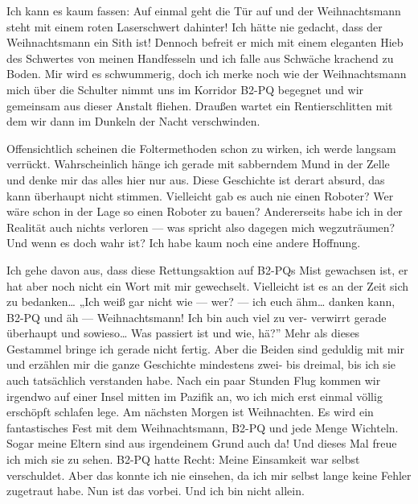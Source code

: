 Ich kann es kaum fassen: Auf einmal geht die Tür auf und der Weihnachtsmann steht mit einem roten Laserschwert dahinter! Ich hätte nie gedacht, dass der Weihnachtsmann ein Sith ist! Dennoch befreit er mich mit einem eleganten Hieb des Schwertes von meinen Handfesseln und ich falle aus Schwäche krachend zu Boden. Mir wird es schwummerig, doch ich merke noch wie der Weihnachtsmann mich über die Schulter nimmt uns im Korridor B2-PQ begegnet und wir gemeinsam aus dieser Anstalt fliehen. Draußen wartet ein Rentierschlitten mit dem wir dann im Dunkeln der Nacht verschwinden.

Offensichtlich scheinen die Foltermethoden schon zu wirken, ich werde langsam verrückt. Wahrscheinlich hänge ich gerade mit sabberndem Mund in der Zelle und denke mir das alles hier nur aus. Diese Geschichte ist derart absurd, das kann überhaupt nicht stimmen. Vielleicht gab es auch nie einen Roboter? Wer wäre schon in der Lage so einen Roboter zu bauen? Andererseits habe ich in der Realität auch nichts verloren — was spricht also dagegen mich wegzuträumen? Und wenn es doch wahr ist? Ich habe kaum noch eine andere Hoffnung.

Ich gehe davon aus, dass diese Rettungsaktion auf B2-PQs Mist gewachsen ist, er hat aber noch nicht ein Wort mit mir gewechselt. Vielleicht ist es an der Zeit sich zu bedanken… „Ich weiß gar nicht wie — wer? — ich euch ähm… danken kann, B2-PQ und äh — Weihnachtsmann! Ich bin auch viel zu ver- verwirrt gerade überhaupt und sowieso… Was passiert ist und wie, hä?” Mehr als dieses Gestammel bringe ich gerade nicht fertig. Aber die Beiden sind geduldig mit mir und erzählen mir die ganze Geschichte mindestens zwei- bis dreimal, bis ich sie auch tatsächlich verstanden habe. Nach ein paar Stunden Flug kommen wir irgendwo auf einer Insel mitten im Pazifik an, wo ich mich erst einmal völlig erschöpft schlafen lege.
Am nächsten Morgen ist Weihnachten. Es wird ein fantastisches Fest mit dem Weihnachtsmann, B2-PQ und jede Menge Wichteln. Sogar meine Eltern sind aus irgendeinem Grund auch da! Und dieses Mal freue ich mich sie zu sehen. B2-PQ hatte Recht: Meine Einsamkeit war selbst verschuldet. Aber das konnte ich nie einsehen, da ich mir selbst lange keine Fehler zugetraut habe. Nun ist das vorbei. Und ich bin nicht allein.